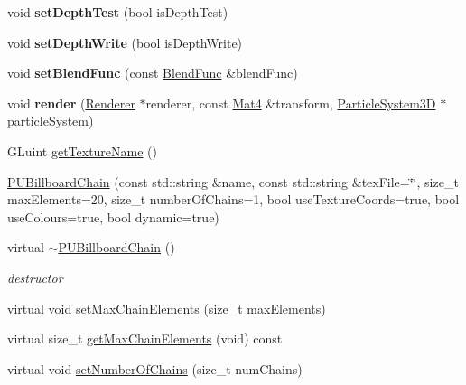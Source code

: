 \begin{DoxyCompactItemize}
\item 
\mbox{\label{classPUBillboardChain_ac4bed36e4fc5ca9c73d4848b58117937}} 
void {\bfseries set\+Depth\+Test} (bool is\+Depth\+Test)
\item 
\mbox{\label{classPUBillboardChain_a75ea76ccea6fb04dac12f2e38539f4dc}} 
void {\bfseries set\+Depth\+Write} (bool is\+Depth\+Write)
\item 
\mbox{\label{classPUBillboardChain_acf3686a91866d52da57fe2924b079c8a}} 
void {\bfseries set\+Blend\+Func} (const \hyperlink{structBlendFunc}{Blend\+Func} \&blend\+Func)
\item 
\mbox{\label{classPUBillboardChain_ac27d8d9b2c29320ac816b686805d050b}} 
void {\bfseries render} (\hyperlink{classRenderer}{Renderer} $\ast$renderer, const \hyperlink{classMat4}{Mat4} \&transform, \hyperlink{classParticleSystem3D}{Particle\+System3D} $\ast$particle\+System)
\item 
G\+Luint \hyperlink{classPUBillboardChain_adb77f3cfeaaeee1e3e7d80396af2767f}{get\+Texture\+Name} ()
\item 
\hyperlink{classPUBillboardChain_a15030a1f3d4f5a1a854a2c5646f21690}{P\+U\+Billboard\+Chain} (const std\+::string \&name, const std\+::string \&tex\+File=\char`\"{}\char`\"{}, size\+\_\+t max\+Elements=20, size\+\_\+t number\+Of\+Chains=1, bool use\+Texture\+Coords=true, bool use\+Colours=true, bool dynamic=true)
\item 
\mbox{\label{classPUBillboardChain_a98f1c4f1d8483a95c6bcec559f76e741}} 
virtual \hyperlink{classPUBillboardChain_a98f1c4f1d8483a95c6bcec559f76e741}{$\sim$\+P\+U\+Billboard\+Chain} ()
\begin{DoxyCompactList}\small\item\em destructor \end{DoxyCompactList}\item 
virtual void \hyperlink{classPUBillboardChain_ab530bb27f0a511663d96f742b1c8fbe3}{set\+Max\+Chain\+Elements} (size\+\_\+t max\+Elements)
\item 
virtual size\+\_\+t \hyperlink{classPUBillboardChain_af8944accdd3c6500700e4508feb703e9}{get\+Max\+Chain\+Elements} (void) const
\item 
virtual void \hyperlink{classPUBillboardChain_ab249ea9d3b16541744335723f21634c3}{set\+Number\+Of\+Chains} (size\+\_\+t num\+Chains)

\end{DoxyCompactItemize}
